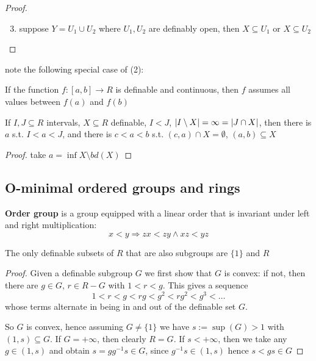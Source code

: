 \documentclass[11pt]{article}
\begin{document}
\begin{proof}
\begin{enumerate}
\setcounter{enumi}{2}
\item suppose \(Y=U_1\cup U_2\) where \(U_1,U_2\) are definably open, then \(X\subseteq U_1\) or \(X\subseteq U_2\)
\end{enumerate}
\end{proof}

note the following special case of (2):
\begin{center}
If the function \(f:[a,b]\to R\) is definable and continuous, then \(f\) assumes all values
between \(f(a)\) and \(f(b)\)
\end{center}

\begin{lemma}[]
If \(I,J\subseteq R\) intervals, \(X\subseteq R\) definable, \(I<J\), \(\abs{I\setminus X}=\infty=\abs{J\cap X}\), then there
is \(a\) s.t. \(I<a<J\), and there is \(c<a<b\) s.t. \((c,a)\cap X=\emptyset\), \((a,b)\subseteq X\)
\end{lemma}

\begin{proof}
take \(a=\inf X\setminus bd(X)\)
\end{proof}
\subsection{O-minimal ordered groups and rings}
\label{sec:org422bf33}
\textbf{Order group} is a group equipped with a linear order that is invariant under left and right
 multiplication:
 \begin{equation*}
x<y\Rightarrow zx<zy\wedge xz<yz
 \end{equation*}

\begin{lemma}[]
The only definable subsets of \(R\) that are also subgroups are \(\{1\}\) and \(R\)
\end{lemma}

\begin{proof}
Given a definable subgroup \(G\) we first show that \(G\) is convex: if not, then there
are \(g\in G\), \(r\in R-G\) with \(1<r<g\). This gives a sequence
 \begin{equation*}
1<r<g<rg<g^2<rg^2<g^3<\dots
 \end{equation*}
whose terms alternate in being in and out of the definable set \(G\).

So \(G\) is convex, hence assuming \(G\neq\{1\}\) we have \(s:=\sup(G)>1\) with \((1,s)\subseteq G\).
If \(G=+\infty\), then clearly \(R=G\). If \(s<+\infty\), then we take any \(g\in(1,s)\) and
obtain \(s=gg^{-1}s\in G\), since \(g^{-1}s\in(1,s)\) hence \(s<gs\in G\)
\end{proof}
\end{document}
